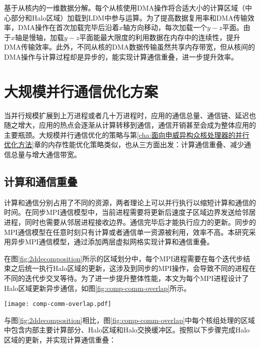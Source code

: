 基于从核内的一维数据分解。每个从核使用DMA操作将合适大小的计算区域（中心部分和Halo区域）加载到LDM中参与运算。为了提高数据复用率和DMA传输效率，DMA操作在首次加载完毕后沿着$x$轴方向移动，每次加载一个$y-z$平面。由于$x$轴是慢轴，加载$y-z$平面能最大限度的利用数据在内存中的连续性，提升DMA传输效率。此外，不同从核的DMA数据传输虽然共享内存带宽，但从核间的DMA操作与计算过程却是异步的，能实现计算通信重叠，进一步提升效率。

\section{大规模并行通信优化方案}

当并行规模扩展到上万进程或者几十万进程时，应用的通信总量、通信链、延迟也随之增大，应用的热点会逐渐从计算转移到通信，通信开销甚至会成为整体应用的主要瓶颈。大规模并行通信优化的策略与第\ref{cha:面向申威异构众核处理器的并行优化方法}章的内存性能优化策略类似，也从三方面出发：计算通信重叠、减少通信总量与增大通信带宽。

\subsection{计算和通信重叠}
\label{sub:计算和通信重叠}
计算和通信分别占用了不同的资源，两者理论上可以并行执行以缩短计算和通信的时间。在同步MPI通信模型中，当前进程需要将更新后速度子区域边界发送给邻居进程，同时也需要从邻居进程接收边界。通信完毕后才能执行应力的更新。同步的MPI通信模型在任意时刻只有计算或者通信单一资源被利用，效率不高。本研究采用异步MPI通信模型，通过添加两层虚拟网格实现计算和通信重叠。

在图\ref{fig:2ddecomposition}所示的区域划分中，每个MPI进程需要在每个迭代步结束之后统一执行Halo区域的更新，这涉及到同步的MPI操作，会导致不同的进程在不同的迭代步交叉等待。为了进一步提升整体性能，本文为每个MPI进程设计了Halo区域更新异步通信，如图\ref{fig:comp-comm-overlap}所示。

\begin{figure*}[ht]
    \centering
    \centering
    \texttt{[image: comp-comm-overlap.pdf]}
    \caption{在边界添加两层虚拟网格实现异步MPI通信。}
    \label{fig:comp-comm-overlap}
\end{figure*}

与图\ref{fig:2ddecomposition}相比，图\ref{fig:comp-comm-overlap}中每个核组处理的区域中包含内部主要计算部分、Halo区域和Halo交换缓冲区。按照以下步骤完成Halo区域的更新，并实现计算通信重叠：

